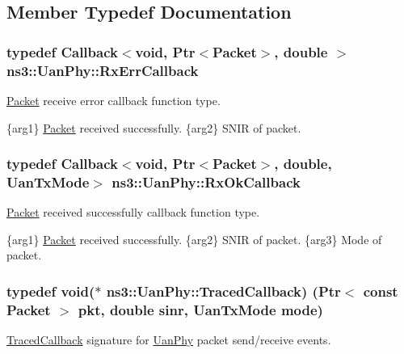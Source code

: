 \subsection{Member Typedef Documentation}
\subsubsection[{\texorpdfstring{Rx\+Err\+Callback}{RxErrCallback}}]{\setlength{\rightskip}{0pt plus 5cm}typedef {\bf Callback}$<$void, {\bf Ptr}$<${\bf Packet}$>$, double $>$ {\bf ns3\+::\+Uan\+Phy\+::\+Rx\+Err\+Callback}}\hypertarget{classns3_1_1UanPhy_ae0da6892a65ba998fb1d649f31b118c4}{}\label{classns3_1_1UanPhy_ae0da6892a65ba998fb1d649f31b118c4}
\hyperlink{classns3_1_1Packet}{Packet} receive error callback function type.

\{arg1\} \hyperlink{classns3_1_1Packet}{Packet} received successfully. \{arg2\} S\+N\+IR of packet. 
\subsubsection[{\texorpdfstring{Rx\+Ok\+Callback}{RxOkCallback}}]{\setlength{\rightskip}{0pt plus 5cm}typedef {\bf Callback}$<$void, {\bf Ptr}$<${\bf Packet}$>$, double, {\bf Uan\+Tx\+Mode}$>$ {\bf ns3\+::\+Uan\+Phy\+::\+Rx\+Ok\+Callback}}\hypertarget{classns3_1_1UanPhy_a0b4ce695657b1c0b7f52ae474f3d98f9}{}\label{classns3_1_1UanPhy_a0b4ce695657b1c0b7f52ae474f3d98f9}
\hyperlink{classns3_1_1Packet}{Packet} received successfully callback function type.

\{arg1\} \hyperlink{classns3_1_1Packet}{Packet} received successfully. \{arg2\} S\+N\+IR of packet. \{arg3\} Mode of packet. 
\subsubsection[{\texorpdfstring{Traced\+Callback}{TracedCallback}}]{\setlength{\rightskip}{0pt plus 5cm}typedef void($\ast$  ns3\+::\+Uan\+Phy\+::\+Traced\+Callback) ({\bf Ptr}$<$ const {\bf Packet} $>$ pkt, double sinr, {\bf Uan\+Tx\+Mode} mode)}\hypertarget{classns3_1_1UanPhy_aff203b7e69331e872156ed03ec897f81}{}\label{classns3_1_1UanPhy_aff203b7e69331e872156ed03ec897f81}
\hyperlink{classns3_1_1TracedCallback}{Traced\+Callback} signature for \hyperlink{classns3_1_1UanPhy}{Uan\+Phy} packet send/receive events.



